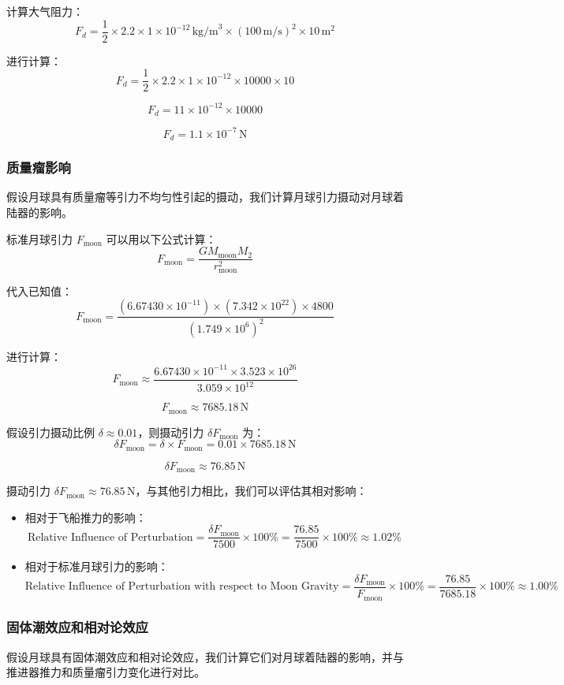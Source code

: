 \documentclass{ctexart}
\begin{document}
计算大气阻力：
\[
F_d = \frac{1}{2} \times 2.2 \times 1 \times 10^{-12} \, \text{kg/m}^3 \times (100 \, \text{m/s})^2 \times 10 \, \text{m}^2
\]

进行计算：
\[
F_d = \frac{1}{2} \times 2.2 \times 1 \times 10^{-12} \times 10000 \times 10
\]

\[
F_d = 11 \times 10^{-12} \times 10000
\]

\[
F_d = 1.1 \times 10^{-7} \, \text{N}
\]

\subsubsection{质量瘤影响}
假设月球具有质量瘤等引力不均匀性引起的摄动，我们计算月球引力摄动对月球着陆器的影响。

标准月球引力 \( F_{\text{moon}} \) 可以用以下公式计算：
\[
F_{\text{moon}} = \frac{G M_{\text{moon}} M_2}{r_{\text{moon}}^2}
\]

代入已知值：
\[
F_{\text{moon}} = \frac{(6.67430 \times 10^{-11}) \times (7.342 \times 10^{22}) \times 4800}{(1.749 \times 10^6)^2}
\]

进行计算：
\[
F_{\text{moon}} \approx \frac{6.67430 \times 10^{-11} \times 3.523 \times 10^{26}}{3.059 \times 10^{12}}
\]

\[
F_{\text{moon}} \approx 7685.18 \, \text{N}
\]

假设引力摄动比例 \(\delta \approx 0.01\)，则摄动引力 \(\delta F_{\text{moon}}\) 为：
\[
\delta F_{\text{moon}} = \delta \times F_{\text{moon}} = 0.01 \times 7685.18 \, \text{N}
\]

\[
\delta F_{\text{moon}} \approx 76.85 \, \text{N}
\]

摄动引力 \( \delta F_{\text{moon}} \approx 76.85 \, \text{N} \)，与其他引力相比，我们可以评估其相对影响：
\begin{itemize}
    \item 相对于飞船推力的影响：
    \[
    \text{Relative Influence of Perturbation} = \frac{\delta F_{\text{moon}}}{7500} \times 100\% = \frac{76.85}{7500} \times 100\% \approx 1.02\%
    \]
    \item 相对于标准月球引力的影响：
    \[
    \text{Relative Influence of Perturbation with respect to Moon Gravity} = \frac{\delta F_{\text{moon}}}{F_{\text{moon}}} \times 100\% = \frac{76.85}{7685.18} \times 100\% \approx 1.00\%
    \]
\end{itemize}

\subsubsection{固体潮效应和相对论效应}
假设月球具有固体潮效应和相对论效应，我们计算它们对月球着陆器的影响，并与推进器推力和质量瘤引力变化进行对比。
\end{document}
